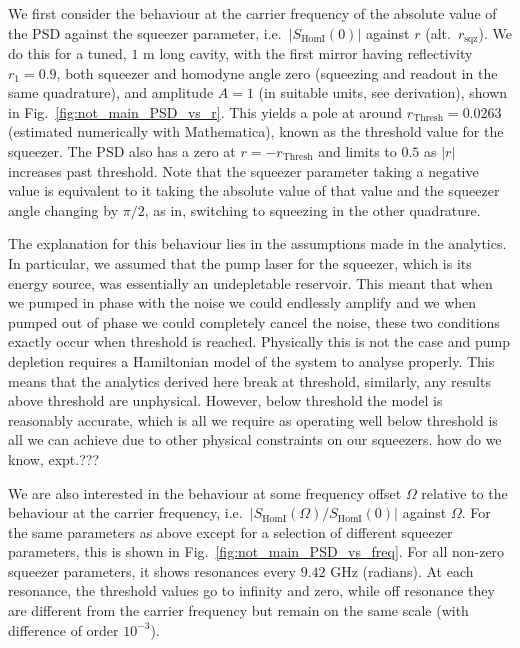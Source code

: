 \documentclass[aps,pra,superscriptaddress,reprint,nofootinbib]{revtex4-1}
\newcommand{\abs}[1]{\left\lvert #1 \right\rvert}
\begin{document}
We first consider the behaviour at the carrier frequency of the absolute value of the PSD against the squeezer parameter, i.e.\ $\abs{S_{\mathrm{HomI}}(0)}$ against $r$ (alt.\ $r_\mathrm{sqz}$). We do this for a tuned, $1$ m long cavity, with the first mirror having reflectivity $r_1 = 0.9$, both squeezer and homodyne angle zero (squeezing and readout in the same quadrature), and amplitude $A = 1$ (in suitable units, see derivation), shown in Fig.~\ref{fig:not_main_PSD_vs_r}. This yields a pole at around $r_\mathrm{Thresh} = 0.0263$ (estimated numerically with Mathematica), known as the threshold value for the squeezer. The PSD also has a zero at $r = -r_\mathrm{Thresh}$ and limits to $0.5$ as $\abs{r}$ increases past threshold. Note that the squeezer parameter taking a negative value is equivalent to it taking the absolute value of that value and the squeezer angle changing by $\pi/2$, as in, switching to squeezing in the other quadrature.


The explanation for this behaviour lies in the assumptions made in the analytics. In particular, we assumed that the pump laser for the squeezer, which is its energy source, was essentially an undepletable reservoir. This meant that when we pumped in phase with the noise we could endlessly amplify and we when pumped out of phase we could completely cancel the noise, these two conditions exactly occur when threshold is reached. Physically this is not the case and pump depletion requires a Hamiltonian model of the system to analyse properly. This means that the analytics derived here break at threshold, similarly, any results above threshold are unphysical.
However, below threshold the model is reasonably accurate, which is all we require as operating well below threshold is all we can achieve due to other physical constraints on our squeezers. {\Large how do we know, expt.???}


We are also interested in the behaviour at some frequency offset $\Omega$ relative to the behaviour at the carrier frequency, i.e.\ $\abs{S_{\mathrm{HomI}}(\Omega)/S_{\mathrm{HomI}}(0)}$ against $\Omega$. For the same parameters as above except for a selection of different squeezer parameters, this is shown in Fig.~\ref{fig:not_main_PSD_vs_freq}. For all non-zero squeezer parameters, it shows resonances every $9.42$ GHz (radians). At each resonance, the threshold values go to infinity and zero, while off resonance they are different from the carrier frequency but remain on the same scale (with difference of order $10^{-3}$).
\end{document}

